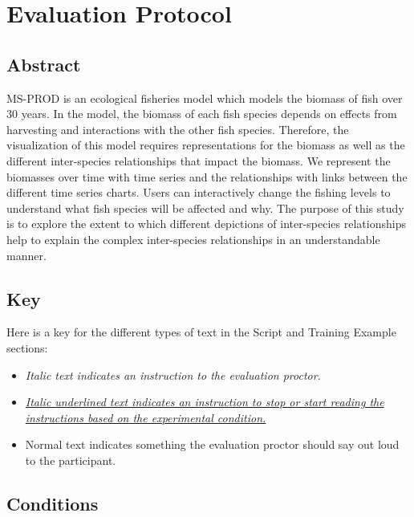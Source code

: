 \section{Evaluation Protocol}

{\setlength{\parskip}{1em} {\setlength{\parindent}{0cm}
{\singlespacing

\subsection{Abstract}

MS-PROD is an ecological fisheries model which models the biomass of fish over 30 years.  In the model, the biomass of each fish species depends on effects from harvesting and interactions with the other fish species.  Therefore, the visualization of this model requires representations for the biomass as well as the different inter-species relationships that impact the biomass.  We represent the biomasses over time with time series and the relationships with links between the different time series charts.  Users can interactively change the fishing levels to understand what fish species will be affected and why.  The purpose of this study is to explore the extent to which different depictions of inter-species relationships help to explain the complex inter-species relationships in an understandable manner.

\subsection{Key}

Here is a key for the different types of text in the Script and Training Example sections:

\begin{itemize}
\item \textit{Italic text indicates an instruction to the evaluation proctor.}
\item \textit{\underline{Italic underlined text indicates an instruction to stop or start reading the} \\ \underline{instructions based on the experimental condition.}}
\item Normal text indicates something the evaluation proctor should say out loud to the participant. 
\end{itemize}

\subsection{Conditions}

}}}
